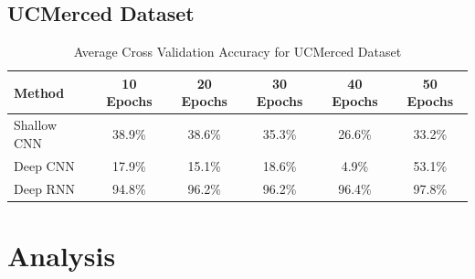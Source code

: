 \documentclass[12pt]{article}
\begin{document}
	\subsection{UCMerced Dataset}
	\begin{table}[h!]
		\begin{center}
			\caption{Average Cross Validation Accuracy for UCMerced Dataset}
			\label{table:ucm}
			\begin{tabular}{l | S | S | S | S |  S}
				\textbf{Method} & \textbf{10 Epochs} & \textbf{20 Epochs} & \textbf{30 Epochs} & \textbf{40 Epochs} & \textbf{50 Epochs} \\
				\hline
				Shallow CNN & 38.9\% & 38.6\% & 35.3\% & 26.6\% & 33.2\% \\
				Deep CNN & 17.9\% & 15.1\% & 18.6\% & 4.9\% & 53.1\% \\
				Deep RNN & 94.8\% & 96.2\% & 96.2\% & 96.4\% & 97.8\% \\
				
			
			\end{tabular}					
		
		
		\end{center}
	
	\end{table}
	
	\section{Analysis}
	
\end{document}
